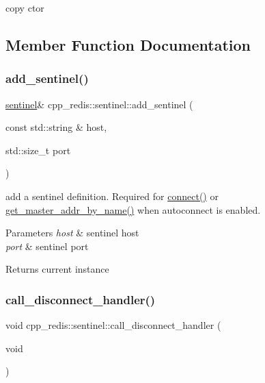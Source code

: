 copy ctor 



\subsection{Member Function Documentation}
\mbox{\label{classcpp__redis_1_1sentinel_a548dad45711dc2e7da7e0803d5a74a2e}} 
\subsubsection{\texorpdfstring{add\+\_\+sentinel()}{add\_sentinel()}}
{\footnotesize\ttfamily \hyperlink{classcpp__redis_1_1sentinel}{sentinel}\& cpp\+\_\+redis\+::sentinel\+::add\+\_\+sentinel (\begin{DoxyParamCaption}\item[{const std\+::string \&}]{host,  }\item[{std\+::size\+\_\+t}]{port }\end{DoxyParamCaption})}

add a sentinel definition. Required for \hyperlink{classcpp__redis_1_1sentinel_a1dfba8240daf7cfa7502f57957cffbda}{connect()} or \hyperlink{classcpp__redis_1_1sentinel_a2886493b40b00dfafdd3b22dfe28e0c3}{get\+\_\+master\+\_\+addr\+\_\+by\+\_\+name()} when autoconnect is enabled.


\begin{DoxyParams}{Parameters}
{\em host} & sentinel host \\
\hline
{\em port} & sentinel port \\
\hline
\end{DoxyParams}
\begin{DoxyReturn}{Returns}
current instance 
\end{DoxyReturn}
\mbox{\label{classcpp__redis_1_1sentinel_aa4721cc3a0b946fa54bb5d321b057a12}} 
\subsubsection{\texorpdfstring{call\+\_\+disconnect\+\_\+handler()}{call\_disconnect\_handler()}}
{\footnotesize\ttfamily void cpp\+\_\+redis\+::sentinel\+::call\+\_\+disconnect\+\_\+handler (\begin{DoxyParamCaption}\item[{void}]{ }\end{DoxyParamCaption})\hspace{0.3cm}{\ttfamily [private]}}

